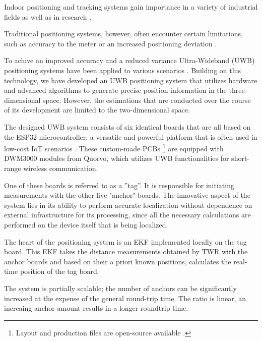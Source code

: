 \documentclass[final, conference, a4paper]{IEEEtran}
\begin{document}
Indoor positioning and tracking systems gain importance in a variety of industrial fields as well as in research \cite{LiFi_Positioning,Accelerometer_Positioning,UWB_Positioning,UWB_Positioning2}.

Traditional positioning systems, however, often encounter certain limitations, such as accuracy to the meter \cite{LiFi_Positioning} or an increased positioning deviation \cite{Accelerometer_Positioning}. 

To achive an improved accuracy and a reduced variance Ultra-Wideband (UWB) positioning systems have been applied to various scenarios \cite{UWB_Positioning} \cite{UWB_Positioning2}.
Building on this technology, we have developed an \ac{UWB} positioning system that utilizes hardware and advanced algorithms to generate precise position information in the three-dimensional space.
However, the estimations that are conducted over the course of its development are limited to the two-dimensional space. 

The designed \ac{UWB} system consists of six identical boards that are all based on the ESP32 microcontroller, a versatile and powerful platform that is often used in low-cost \ac{IoT} scenarios \cite{ESP32}. 
These custom-made \acp{PCB} \footnote{Layout and production files are open-source available \cite{uwb-tracking}.} are equipped with DWM3000 modules from Quorvo, which utilizes \ac{UWB} functionalities for short-range wireless communication.

One of these boards is referred to as a ''tag''.
It is responsible for initiating measurements with the other five "anchor" boards.
The innovative aspect of the system lies in its ability to perform accurate localization without dependence on external infrastructure for its processing,
since all the necessary calculations are performed on the device itself that is being localized.

The heart of the positioning system is an \acf{EKF} implemented locally on the tag board.
This \ac{EKF} takes the distance measurements obtained by \acf{TWR} with the anchor boards
and based on their a priori known positions, calculates the real-time position of the tag board.

The system is partially scalable; the number of anchors can be significantly increased at
the expense of the general round-trip time.
The ratio is linear, an increaing anchor amount results in a longer roundtrip time.
\end{document}
